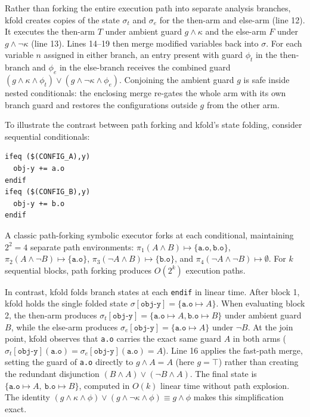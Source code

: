 \documentclass[acmsmall]{acmart}
\newcommand{\tool}{\textsf{kfold}\xspace}
\begin{document}
Rather than forking the entire execution path into separate analysis branches, \tool creates copies of the state $\sigma_t$ and $\sigma_e$ for the then-arm and else-arm (line 12).
It executes the then-arm $T$ under ambient guard $g \land \kappa$ and the else-arm $F$ under $g \land \neg\kappa$ (line 13).
Lines 14--19 then merge modified variables back into $\sigma$.
For each variable $n$ assigned in either branch, an entry present with guard $\phi_t$ in the then-branch and $\phi_e$ in the else-branch receives the combined guard $(g \land \kappa \land \phi_t) \lor (g \land \neg\kappa \land \phi_e)$.
Conjoining the ambient guard $g$ is safe inside nested conditionals: the enclosing merge re-gates the whole arm with its own branch guard and restores the configurations outside $g$ from the other arm.

To illustrate the contrast between path forking and \tool's state folding, consider sequential conditionals:
\begin{lstlisting}[style=kbuild-example]
ifeq ($(CONFIG_A),y)
  obj-y += a.o
endif
ifeq ($(CONFIG_B),y)
  obj-y += b.o
endif
\end{lstlisting}
A classic path-forking symbolic executor forks at each conditional, maintaining $2^2 = 4$ separate path environments:
$\pi_1(A \land B) \mapsto \{\texttt{a.o}, \texttt{b.o}\}$, $\pi_2(A \land \neg B) \mapsto \{\texttt{a.o}\}$, $\pi_3(\neg A \land B) \mapsto \{\texttt{b.o}\}$, and $\pi_4(\neg A \land \neg B) \mapsto \emptyset$.
For $k$ sequential blocks, path forking produces $O(2^k)$ execution paths.

In contrast, \tool folds branch states at each \texttt{endif} in linear time.
After block 1, \tool holds the single folded state $\sigma[\texttt{obj-y}] = \{\texttt{a.o} \mapsto A\}$.
When evaluating block 2, the then-arm produces $\sigma_t[\texttt{obj-y}] = \{\texttt{a.o} \mapsto A, \texttt{b.o} \mapsto B\}$ under ambient guard $B$, while the else-arm produces $\sigma_e[\texttt{obj-y}] = \{\texttt{a.o} \mapsto A\}$ under $\neg B$.
At the join point, \tool observes that \texttt{a.o} carries the exact same guard $A$ in both arms ($\sigma_t[\texttt{obj-y}](\texttt{a.o}) = \sigma_e[\texttt{obj-y}](\texttt{a.o}) = A$).
Line 16 applies the fast-path merge, setting the guard of \texttt{a.o} directly to $g \land A = A$ (here $g = \top$) rather than creating the redundant disjunction $(B \land A) \lor (\neg B \land A)$.
The final state is $\{\texttt{a.o} \mapsto A,\ \texttt{b.o} \mapsto B\}$, computed in $O(k)$ linear time without path explosion.
The identity $(g \land \kappa \land \phi) \lor (g \land \neg\kappa \land \phi) \equiv g \land \phi$ makes this simplification exact.
\end{document}
